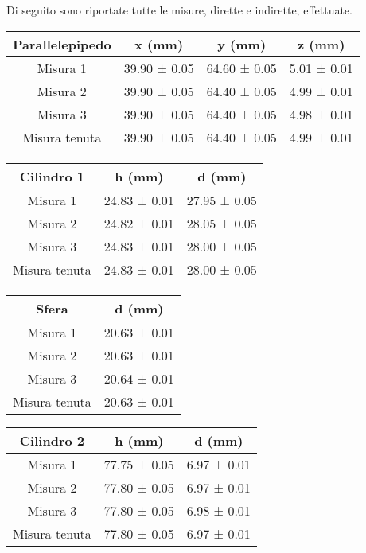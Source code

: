 \documentclass{article}
\begin{document}
Di seguito sono riportate tutte le misure, dirette e indirette, effettuate.

\begin{center}
    \begin{tabular}{ |c|c|c|c| }
        \hline
        Parallelepipedo & x (mm) & y (mm) & z (mm) \\
        \hline
        Misura 1 & 39.90 ± 0.05 & 64.60 ± 0.05 & 5.01 ± 0.01 \\
        Misura 2 & 39.90 ± 0.05 & 64.40 ± 0.05 & 4.99 ± 0.01 \\
        Misura 3 & 39.90 ± 0.05 & 64.40 ± 0.05 & 4.98 ± 0.01 \\
        \hline
        Misura tenuta & 39.90 ± 0.05 & 64.40 ± 0.05 & 4.99 ± 0.01 \\
        \hline
    \end{tabular}

    \begin{tabular}{ |c|c|c| }
        \hline
        Cilindro 1 & h (mm) & d (mm) \\
        \hline
        Misura 1 & 24.83 ± 0.01 & 27.95 ± 0.05 \\
        Misura 2 & 24.82 ± 0.01 & 28.05 ± 0.05 \\
        Misura 3 & 24.83 ± 0.01 & 28.00 ± 0.05 \\
        \hline
        Misura tenuta & 24.83 ± 0.01 & 28.00 ± 0.05 \\
        \hline
    \end{tabular}

    \begin{tabular}{ |c|c| }
        \hline
        Sfera & d (mm) \\
        \hline
        Misura 1 & 20.63 ± 0.01 \\
        Misura 2 & 20.63 ± 0.01 \\
        Misura 3 & 20.64 ± 0.01 \\
        \hline
        Misura tenuta & 20.63 ± 0.01 \\
        \hline
    \end{tabular}

    \begin{tabular}{ |c|c|c| }
        \hline
        Cilindro 2 & h (mm) & d (mm) \\
        \hline
        Misura 1 & 77.75 ± 0.05 & 6.97 ± 0.01 \\
        Misura 2 & 77.80 ± 0.05 & 6.97 ± 0.01 \\
        Misura 3 & 77.80 ± 0.05 & 6.98 ± 0.01 \\
        \hline
        Misura tenuta & 77.80 ± 0.05 & 6.97 ± 0.01 \\
        \hline
    \end{tabular}


\end{center}
\end{document}
